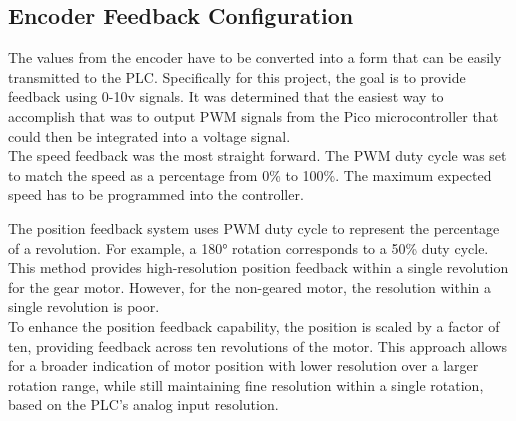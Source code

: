 \documentclass[main.tex]{subfiles}
\begin{document}
\subsection{Encoder Feedback Configuration}

The values from the encoder have to be converted into a form that can be easily transmitted to the PLC. Specifically for this project, the goal is to provide feedback using 0-10v signals. It was determined that the easiest way to accomplish that was to output PWM signals from the Pico microcontroller that could then be integrated into a voltage signal. \\

\noindent The speed feedback was the most straight forward. The PWM duty cycle was set to match the speed as a percentage from 0\% to 100\%. The maximum expected speed has to be programmed into the controller.

The position feedback system uses PWM duty cycle to represent the percentage of a revolution. For example, a 180° rotation corresponds to a 50\% duty cycle. This method provides high-resolution position feedback within a single revolution for the gear motor. However, for the non-geared motor, the resolution within a single revolution is poor.\\

\noindent To enhance the position feedback capability, the position is scaled by a factor of ten, providing feedback across ten revolutions of the motor. This approach allows for a broader indication of motor position with lower resolution over a larger rotation range, while still maintaining fine resolution within a single rotation, based on the PLC's analog input resolution.
\end{document}

